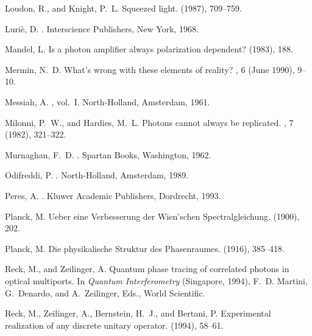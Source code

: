 \begin{thebibliography}{100}
{\sc Loudon, R., and Knight, P.~L.}
\newblock Squeezed light.
 (1987), 709--759.

{\sc Luri{\`{e}}, D.}
.
\newblock Interscience Publishers, New York, 1968.

{\sc Mandel, L.}
\newblock Is a photon amplifier always polarization dependent?
 (1983), 188.

{\sc Mermin, N.~D.}
\newblock What's wrong with these elements of reality?
, 6 (June 1990), 9--10.

{\sc Messiah, A.}
, vol.~I.
\newblock North-Holland, Amsterdam, 1961.

{\sc Milonni, P.~W., and Hardies, M.~L.}
\newblock Photons cannot always be replicated.
, 7 (1982), 321--322.

{\sc Murnaghan, F.~D.}
.
\newblock Spartan Books, Washington, 1962.

{\sc Odifreddi, P.}
.
\newblock North-Holland, Amsterdam, 1989.

{\sc Peres, A.}
.
\newblock Kluwer Academic Publishers, Dordrecht, 1993.

{\sc Planck, M.}
\newblock Ueber eine {V}erbesserung der {W}ien'schen {S}pectralgleichung.
  (1900), 202.

{\sc Planck, M.}
\newblock Die physikalische {S}truktur des {P}hasenraumes.
 (1916), 385--418.

{\sc Reck, M., and Zeilinger, A.}
\newblock Quantum phase tracing of correlated photons in optical multiports.
\newblock In {\em Quantum Interferometry\/} (Singapore, 1994), F.~D. Martini,
  G.~Denardo, and A.~Zeilinger, Eds., World Scientific.

{\sc Reck, M., Zeilinger, A., Bernstein, H.~J., and Bertani, P.}
\newblock Experimental realization of any discrete unitary operator.
 (1994), 58--61.


\end{thebibliography}
